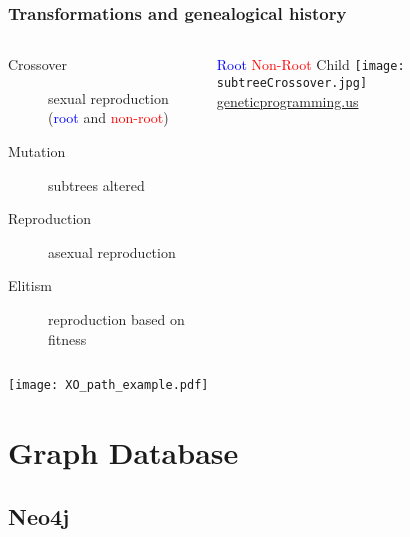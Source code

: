 \documentclass{beamer}
\begin{document}
\begin{frame}
\frametitle{Transformations and genealogical history}
\begin{columns}
\begin{column}{0.55\textwidth}
{\footnotesize
		\begin{description}
		\item[Crossover] sexual reproduction \\ (\textcolor{blue}{root} and \textcolor{red}{non-root})
		\item[Mutation] subtrees altered
		\item[Reproduction] asexual reproduction
		\item[Elitism] reproduction based on fitness
		\end{description}
}
\end{column}
\begin{column}{0.45\textwidth}
{\tiny \hspace{0.3cm} \textcolor{blue}{Root} \hspace{1cm} \textcolor{red}{Non-Root} \hspace{1cm} Child}
\texttt{[image: subtreeCrossover.jpg]} \\
{\tiny \hspace{2.5cm} \url{geneticprogramming.us}}
\end{column}
\end{columns}
\vspace*{-0.5cm}
\begin{center}
\texttt{[image: XO\_path\_example.pdf]}
\end{center}
\end{frame}

\section[Graph DB]{Graph Database}
\subsection{Neo4j}
\end{document}
